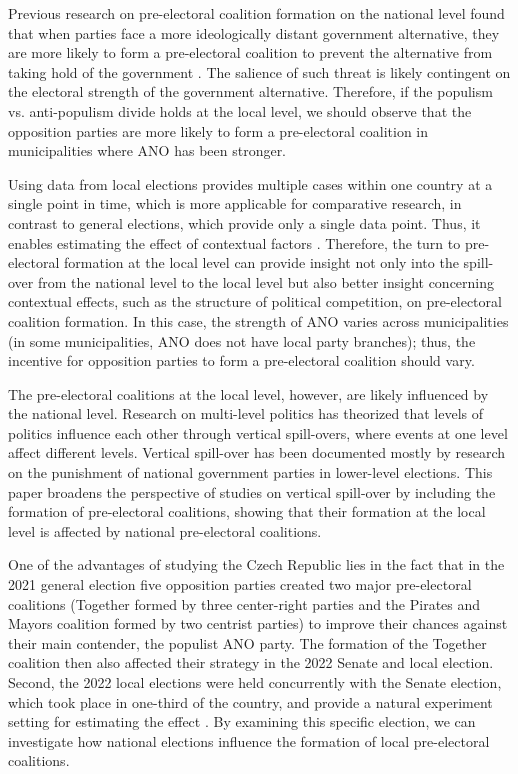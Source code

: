 \documentclass[]{interact}
\theoremstyle{plain}%
\theoremstyle{definition}
\theoremstyle{remark}
\begin{document}
Previous research on pre-electoral coalition formation on the national level found that when parties face a more ideologically distant government alternative, they are more likely to form a pre-electoral coalition to prevent the alternative from taking hold of the government \citep{golder2006}. The salience of such threat is likely contingent on the electoral strength of the government alternative. Therefore, if the populism vs. anti-populism divide holds at the local level, we should observe that the opposition parties are more likely to form a pre-electoral coalition in municipalities where ANO has been stronger. 

Using data from local elections provides multiple cases within one country at a single point in time, which is more applicable for comparative research, in contrast to general elections, which provide only a single data point. Thus, it enables estimating the effect of contextual factors \citep[77]{back2008}. Therefore, the turn to pre-electoral formation at the local level can provide insight not only into the spill-over from the national level to the local level but also better insight concerning contextual effects, such as the structure of political competition, on pre-electoral coalition formation. In this case, the strength of ANO varies across municipalities (in some municipalities, ANO does not have local party branches); thus, the incentive for opposition parties to form a pre-electoral coalition should vary.

The pre-electoral coalitions at the local level, however, are likely influenced by the national level. Research on multi-level politics has theorized that levels of politics influence each other through vertical spill-overs, where events at one level affect different levels. Vertical spill-over has been documented mostly by research on the punishment of national government parties in lower-level elections. This paper broadens the perspective of studies on vertical spill-over by including the formation of pre-electoral coalitions, showing that their formation at the local level is affected by national pre-electoral coalitions.

One of the advantages of studying the Czech Republic lies in the fact that in the 2021 general election five opposition parties created two major pre-electoral coalitions (Together formed by three center-right parties and the Pirates and Mayors coalition formed by two centrist parties) to improve their chances against their main contender, the populist ANO party. The formation of the Together coalition then also affected their strategy in the 2022 Senate and local election. Second, the 2022 local elections were held concurrently with the Senate election, which took place in one-third of the country, and provide a natural experiment setting for estimating the effect \citep[cf.][]{roberts2018,lysek2022}. By examining this specific election, we can investigate how national elections influence the formation of local pre-electoral coalitions.
\end{document}
